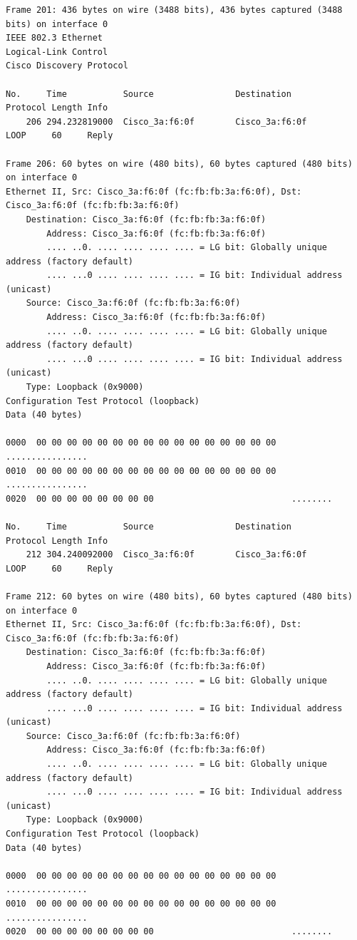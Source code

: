 \documentclass[a4paper,11pt]{article}
\begin{document}
\begin{lstlisting}
Frame 201: 436 bytes on wire (3488 bits), 436 bytes captured (3488 bits) on interface 0
IEEE 802.3 Ethernet 
Logical-Link Control
Cisco Discovery Protocol

No.     Time           Source                Destination           Protocol Length Info
    206 294.232819000  Cisco_3a:f6:0f        Cisco_3a:f6:0f        LOOP     60     Reply

Frame 206: 60 bytes on wire (480 bits), 60 bytes captured (480 bits) on interface 0
Ethernet II, Src: Cisco_3a:f6:0f (fc:fb:fb:3a:f6:0f), Dst: Cisco_3a:f6:0f (fc:fb:fb:3a:f6:0f)
    Destination: Cisco_3a:f6:0f (fc:fb:fb:3a:f6:0f)
        Address: Cisco_3a:f6:0f (fc:fb:fb:3a:f6:0f)
        .... ..0. .... .... .... .... = LG bit: Globally unique address (factory default)
        .... ...0 .... .... .... .... = IG bit: Individual address (unicast)
    Source: Cisco_3a:f6:0f (fc:fb:fb:3a:f6:0f)
        Address: Cisco_3a:f6:0f (fc:fb:fb:3a:f6:0f)
        .... ..0. .... .... .... .... = LG bit: Globally unique address (factory default)
        .... ...0 .... .... .... .... = IG bit: Individual address (unicast)
    Type: Loopback (0x9000)
Configuration Test Protocol (loopback)
Data (40 bytes)

0000  00 00 00 00 00 00 00 00 00 00 00 00 00 00 00 00   ................
0010  00 00 00 00 00 00 00 00 00 00 00 00 00 00 00 00   ................
0020  00 00 00 00 00 00 00 00                           ........

No.     Time           Source                Destination           Protocol Length Info
    212 304.240092000  Cisco_3a:f6:0f        Cisco_3a:f6:0f        LOOP     60     Reply

Frame 212: 60 bytes on wire (480 bits), 60 bytes captured (480 bits) on interface 0
Ethernet II, Src: Cisco_3a:f6:0f (fc:fb:fb:3a:f6:0f), Dst: Cisco_3a:f6:0f (fc:fb:fb:3a:f6:0f)
    Destination: Cisco_3a:f6:0f (fc:fb:fb:3a:f6:0f)
        Address: Cisco_3a:f6:0f (fc:fb:fb:3a:f6:0f)
        .... ..0. .... .... .... .... = LG bit: Globally unique address (factory default)
        .... ...0 .... .... .... .... = IG bit: Individual address (unicast)
    Source: Cisco_3a:f6:0f (fc:fb:fb:3a:f6:0f)
        Address: Cisco_3a:f6:0f (fc:fb:fb:3a:f6:0f)
        .... ..0. .... .... .... .... = LG bit: Globally unique address (factory default)
        .... ...0 .... .... .... .... = IG bit: Individual address (unicast)
    Type: Loopback (0x9000)
Configuration Test Protocol (loopback)
Data (40 bytes)

0000  00 00 00 00 00 00 00 00 00 00 00 00 00 00 00 00   ................
0010  00 00 00 00 00 00 00 00 00 00 00 00 00 00 00 00   ................
0020  00 00 00 00 00 00 00 00                           ........


\end{lstlisting}
\end{document}
